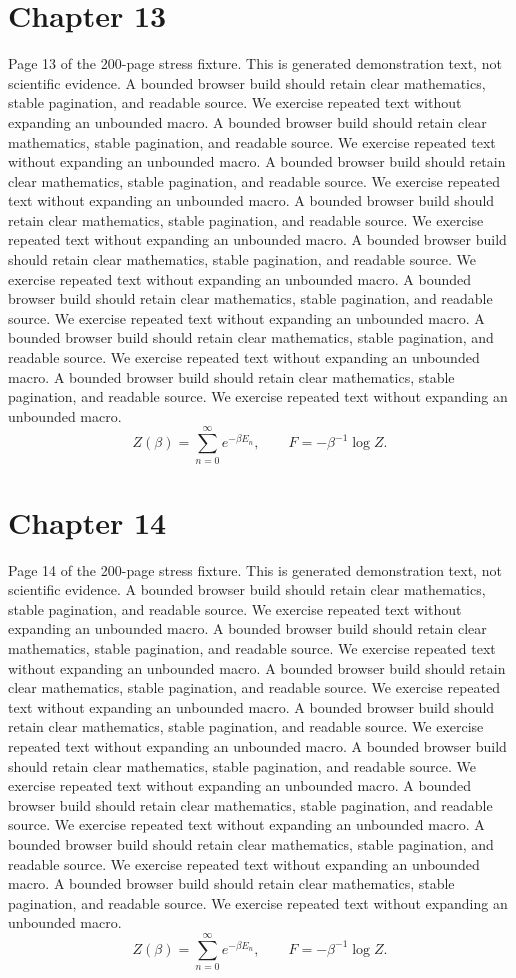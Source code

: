 \documentclass[11pt]{article}
\begin{document}
\section*{Chapter 13}
Page 13 of the 200-page stress fixture. This is generated demonstration text, not scientific evidence.
A bounded browser build should retain clear mathematics, stable pagination, and readable source. We exercise repeated text without expanding an unbounded macro.
A bounded browser build should retain clear mathematics, stable pagination, and readable source. We exercise repeated text without expanding an unbounded macro.
A bounded browser build should retain clear mathematics, stable pagination, and readable source. We exercise repeated text without expanding an unbounded macro.
A bounded browser build should retain clear mathematics, stable pagination, and readable source. We exercise repeated text without expanding an unbounded macro.
A bounded browser build should retain clear mathematics, stable pagination, and readable source. We exercise repeated text without expanding an unbounded macro.
A bounded browser build should retain clear mathematics, stable pagination, and readable source. We exercise repeated text without expanding an unbounded macro.
A bounded browser build should retain clear mathematics, stable pagination, and readable source. We exercise repeated text without expanding an unbounded macro.
A bounded browser build should retain clear mathematics, stable pagination, and readable source. We exercise repeated text without expanding an unbounded macro.
\[Z(\beta)=\sum_{n=0}^{\infty}e^{-\beta E_n},\qquad F=-\beta^{-1}\log Z.\]
\newpage
\section*{Chapter 14}
Page 14 of the 200-page stress fixture. This is generated demonstration text, not scientific evidence.
A bounded browser build should retain clear mathematics, stable pagination, and readable source. We exercise repeated text without expanding an unbounded macro.
A bounded browser build should retain clear mathematics, stable pagination, and readable source. We exercise repeated text without expanding an unbounded macro.
A bounded browser build should retain clear mathematics, stable pagination, and readable source. We exercise repeated text without expanding an unbounded macro.
A bounded browser build should retain clear mathematics, stable pagination, and readable source. We exercise repeated text without expanding an unbounded macro.
A bounded browser build should retain clear mathematics, stable pagination, and readable source. We exercise repeated text without expanding an unbounded macro.
A bounded browser build should retain clear mathematics, stable pagination, and readable source. We exercise repeated text without expanding an unbounded macro.
A bounded browser build should retain clear mathematics, stable pagination, and readable source. We exercise repeated text without expanding an unbounded macro.
A bounded browser build should retain clear mathematics, stable pagination, and readable source. We exercise repeated text without expanding an unbounded macro.
\[Z(\beta)=\sum_{n=0}^{\infty}e^{-\beta E_n},\qquad F=-\beta^{-1}\log Z.\]
\newpage
\end{document}

